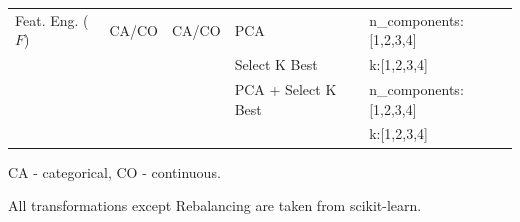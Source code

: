 \begin{example}
\begin{table}[!t]
\begin{threeparttable}
\begin{tabular}{@{}p{30mm}lll>{\ttfamily}l@{}}
Feat. Eng. ($F$) & CA/CO & CA/CO & PCA & n\_components:[1,2,3,4]\\ \cmidrule[.05em]{4-5}
&  &  & Select K Best & k:[1,2,3,4]\\ \cmidrule[.05em]{4-5}
&  &  & PCA + Select K Best  & n\_components:[1,2,3,4]
\\ \cmidrule[.05em]{4-5} & & & & k:[1,2,3,4]\\	\bottomrule%
\end{tabular}
\begin{tablenotes}
\footnotesize
\item CA - categorical, CO - continuous.
\item *All transformations except Rebalancing are taken from scikit-learn.
\end{tablenotes}
\end{threeparttable}
\label{tbl:transformations}
\end{table}
\end{example}

